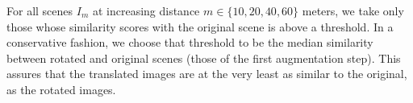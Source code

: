 
For all scenes $I_m$ at increasing distance $m \in \{10,20,40,60\}$ meters,  we take only those whose similarity scores with the original scene is above a threshold. In a conservative fashion, we choose that threshold to be the median similarity between rotated and original scenes (those of the first augmentation step). This assures that the translated images are at the very least as similar to the original, as the rotated images.


